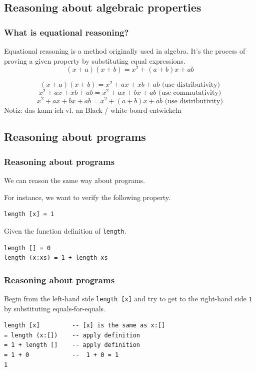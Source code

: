 \documentclass{beamer}
\begin{document}
\subsection{Reasoning about algebraic properties}

\begin{frame}
  \frametitle{What is equational reasoning?}
Equational reasoning is a method originally used in algebra.
 It's the process of proving a given property by substituting equal expressions.
\begin{equation}
  \label{eq:sum}
  (x+a)(x+b) = x^2 + (a+b)x+ab
\end{equation}

\begin{equation}
  \label{eq:firstalgebra}
  (x+a)(x+b) = x^2 + ax + xb + ab \text{     (use distributivity)}
\end{equation}
\begin{equation}
x^2 + ax + xb + ab = x^2 + ax + bx + ab \text{     (use commutativity)}
\end{equation}
\begin{equation}
x^2 + ax + bx + ab = x^2 + (a + b)x + ab \text{     (use distributivity)}
\end{equation}
Notiz: das kann ich vl. an Black / white board entwickeln
\end{frame}

\subsection{Reasoning about programs}

\begin{frame}[fragile]
  \frametitle{Reasoning about programs}
  We can reason the same way about programs.

For instance, we want to verify the following property.
\begin{verbatim}
length [x] = 1
\end{verbatim}
Given the function definition of \verb|length|.
\begin{verbatim}
length [] = 0
length (x:xs) = 1 + length xs  
\end{verbatim}

\end{frame}

\begin{frame}[fragile]
  \frametitle{Reasoning about programs}
Begin from the left-hand side \verb|length [x]| and try to get to the right-hand side \verb|1| by substituting equals-for-equals.
\begin{verbatim}
length [x]         -- [x] is the same as x:[]
= length (x:[])    -- apply definition
= 1 + length []    -- apply definition
= 1 + 0            --  1 + 0 = 1
1
\end{verbatim}
\end{frame}
\end{document}
